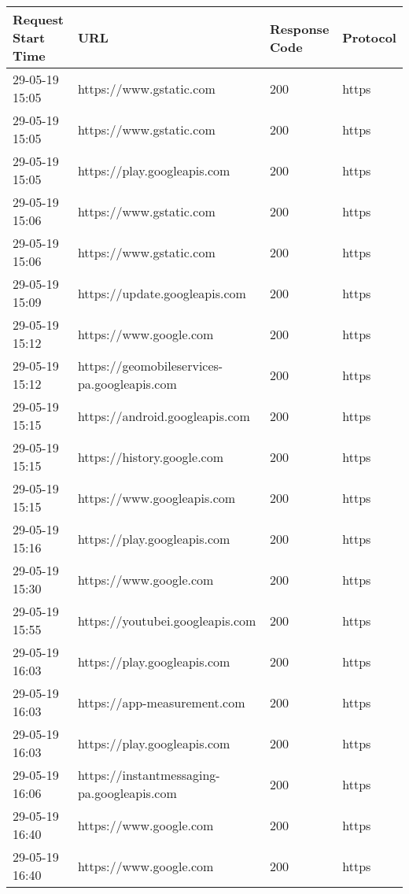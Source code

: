 \begin{longtable}[c]{@{}llll@{}}
    \toprule
    Request Start Time & URL & Response Code & Protocol \\* \midrule
    \endhead
    \bottomrule
    \endfoot
    \endlastfoot
    29-05-19 15:05 & https://www.gstatic.com & 200 & https \\
    29-05-19 15:05 & https://www.gstatic.com & 200 & https \\
    29-05-19 15:05 & https://play.googleapis.com & 200 & https \\
    29-05-19 15:06 & https://www.gstatic.com & 200 & https \\
    29-05-19 15:06 & https://www.gstatic.com & 200 & https \\
    29-05-19 15:09 & https://update.googleapis.com & 200 & https \\
    29-05-19 15:12 & https://www.google.com & 200 & https \\
    29-05-19 15:12 & https://geomobileservices-pa.googleapis.com & 200 & https \\
    29-05-19 15:15 & https://android.googleapis.com & 200 & https \\
    29-05-19 15:15 & https://history.google.com & 200 & https \\
    29-05-19 15:15 & https://www.googleapis.com & 200 & https \\
    29-05-19 15:16 & https://play.googleapis.com & 200 & https \\
    29-05-19 15:30 & https://www.google.com & 200 & https \\
    29-05-19 15:55 & https://youtubei.googleapis.com & 200 & https \\
    29-05-19 16:03 & https://play.googleapis.com & 200 & https \\
    29-05-19 16:03 & https://app-measurement.com & 200 & https \\
    29-05-19 16:03 & https://play.googleapis.com & 200 & https \\
    29-05-19 16:06 & https://instantmessaging-pa.googleapis.com & 200 & https \\
    29-05-19 16:40 & https://www.google.com & 200 & https \\
    29-05-19 16:40 & https://www.google.com & 200 & https \\

\end{longtable}
